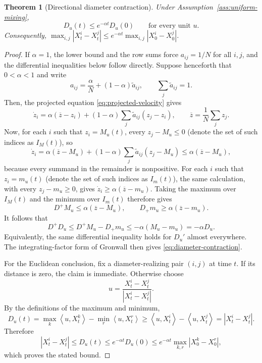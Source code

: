 \documentclass[11pt]{amsart}
\numberwithin{equation}{section}
\theoremstyle{plain}
\newtheorem{theorem}{Theorem}[section]
\newcommand{\abs}[1]{\left\lvert#1\right\rvert}
\newcommand{\ip}[2]{\left\langle#1,#2\right\rangle}
\begin{document}
\begin{theorem}[Directional diameter contraction]\label{thm:diameter}
Under Assumption~\ref{ass:uniform-mixing},
\begin{equation}\label{eq:diameter-contraction}
    D_u(t)\leq e^{-\alpha t}D_u(0)
    \qquad\text{for every unit }u.
\end{equation}
Consequently,
$\max_{i,j}\abs{X_t^i-X_t^j}\leq
e^{-\alpha t}\max_{i,j}\abs{X_0^i-X_0^j}$.
\end{theorem}
\begin{proof}
If $\alpha=1$, the lower bound and the row sums force
$a_{ij}=1/N$ for all $i,j$, and the differential inequalities below follow
directly.  Suppose henceforth that $0<\alpha<1$ and write
\[
 a_{ij}=\frac{\alpha}{N}+(1-\alpha)\widetilde a_{ij},
 \qquad \sum_j\widetilde a_{ij}=1.
\]
Then, the projected equation \eqref{eq:projected-velocity} gives
\begin{equation}\label{eq:consensus-uniform-remainder}
 \dot z_i
 =\alpha(\overline z-z_i)
 +(1-\alpha)\sum_j\widetilde a_{ij}(z_j-z_i),
 \qquad \overline z=\frac1N\sum_j z_j.
\end{equation}
 Now, for each $i$ such that $z_i=M_u(t)$, every $z_j-M_u\leq0$ (denote the set of such indices as $I_M(t)$), so
\[
 \dot z_i
 =\alpha(\overline z-M_u)
 +(1-\alpha)\sum_j\widetilde a_{ij}(z_j-M_u)
 \leq\alpha(\overline z-M_u),
\]
because every summand in the remainder is nonpositive.  For each
$i$ such that $z_i=m_u(t)$ (denote the set of such indices as $I_m(t)$), the same calculation, with every $z_j-m_u\geq0$, gives
$\dot z_i\geq\alpha(\overline z-m_u)$.  Taking the maximum over $I_M(t)$ and
the minimum over $I_m(t)$ therefore gives
\[
 D^+M_u\leq\alpha(\overline z-M_u),
 \qquad
 D_+m_u\geq\alpha(\overline z-m_u).
\]
It follows that
\[
 D^+D_u\leq D^+M_u-D_+m_u
 \leq-\alpha(M_u-m_u)=-\alpha D_u.
\]
Equivalently, the same differential inequality holds for $D_u'$ almost
everywhere.  The integrating-factor form of Gronwall then gives
\eqref{eq:diameter-contraction}.


For the Euclidean conclusion, fix a
diameter-realizing pair $(i,j)$ at time $t$.  If its distance is zero, the
claim is immediate.  Otherwise choose
\[
 u=\frac{X_t^i-X_t^j}{\abs{X_t^i-X_t^j}}.
\]
By the definitions of the maximum and minimum,
\[
 D_u(t)=\max_k\ip{u}{X_t^k}-\min_r\ip{u}{X_t^r}
 \geq\ip{u}{X_t^i}-\ip{u}{X_t^j}
 =\abs{X_t^i-X_t^j}.
\]
Therefore
\[
 \abs{X_t^i-X_t^j}
 \leq D_u(t)
 \leq e^{-\alpha t}D_u(0)
 \leq e^{-\alpha t}\max_{k,r}\abs{X_0^k-X_0^r},
\]
which proves the stated bound.
\end{proof}
\end{document}
